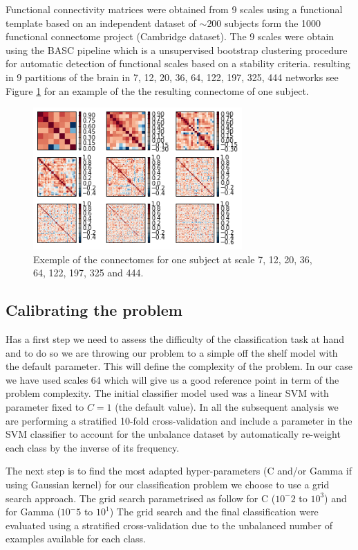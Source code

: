 \documentclass[12pt,journal,compsoc]{IEEEtran}
\begin{document}
Functional connectivity matrices were obtained from 9 scales using a functional template based on an independent dataset of $\sim 200$ subjects form the 1000 functional connectome project (Cambridge dataset). The 9 scales were obtain using the BASC pipeline \cite{Bellec2010a} which is a unsupervised bootstrap clustering procedure for automatic detection of functional scales based on a stability criteria. resulting in 9 partitions of the brain in 7, 12, 20, 36, 64, 122, 197, 325, 444 networks see Figure \ref{fig_connectomes3x3} for an example of the the resulting connectome of one subject.

\begin{figure}[h]
\centering
\includegraphics[width=8cm]{connectome3x3.png}
\caption{Exemple of the connectomes for one subject at scale 7, 12, 20, 36, 64, 122, 197, 325 and 444.}
\label{fig_connectomes3x3}
\end{figure}

\subsection{Calibrating the problem}

Has a first step we need to assess the difficulty of the classification task at hand and to do so we are throwing our problem to a simple off the shelf model with the default parameter. This will define the complexity of the problem. In our case we have used scales 64 which will give us a good reference point in term of the problem complexity. The initial classifier model used was a linear SVM with parameter fixed to $C=1$ (the default value). In all the subsequent analysis we are performing a stratified 10-fold cross-validation and include a parameter in the SVM classifier to account for the unbalance dataset by automatically re-weight each class by the inverse of its frequency.

The next step is to find the most adapted hyper-parameters (C and/or Gamma if using Gaussian kernel) for our classification problem we choose to use a grid search approach. The grid search parametrised as follow for C ($10^-2$ to $10^3$) and for Gamma ($10^-5$ to $10^1$) The grid search and the final classification were evaluated using a stratified cross-validation due to the unbalanced number of examples available for each class.
\end{document}
